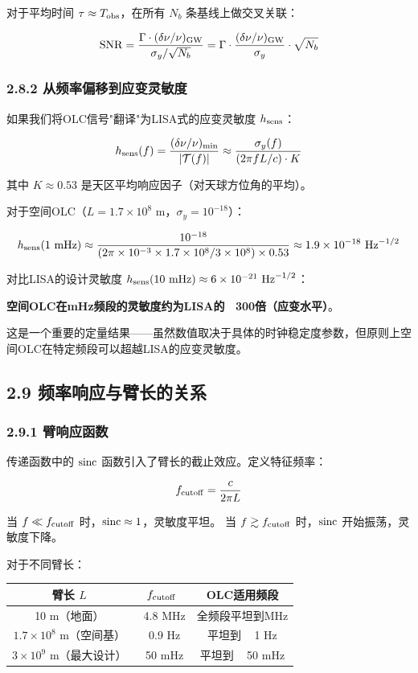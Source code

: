 \documentclass[12pt,a4paper]{article}
\begin{document}
对于平均时间 $\tau \approx T_{\rm obs}$，在所有 $N_b$ 条基线上做交叉关联：

$${\rm SNR} = \frac{\Gamma \cdot (\delta\nu/\nu)_{\rm GW}}{\sigma_y / \sqrt{N_b}} = \Gamma \cdot \frac{(\delta\nu/\nu)_{\rm GW}}{\sigma_y} \cdot \sqrt{N_b}$$

\subsubsection{2.8.2 从频率偏移到应变灵敏度}


如果我们将OLC信号"翻译"为LISA式的应变灵敏度 $h_{\rm sens}$：

$$h_{\rm sens}(f) = \frac{(\delta\nu/\nu)_{\rm min}}{|\mathcal{T}(f)|} \approx \frac{\sigma_y(f)}{(2\pi f L/c) \cdot K}$$

其中 $K \approx 0.53$ 是天区平均响应因子（对天球方位角的平均）。

对于空间OLC（$L = 1.7 \times 10^8$ m，$\sigma_y = 10^{-18}$）：

$$h_{\rm sens}(1\ {\rm mHz}) \approx \frac{10^{-18}}{(2\pi \times 10^{-3} \times 1.7\times 10^8 / 3\times 10^8) \times 0.53} \approx 1.9 \times 10^{-18}\ {\rm Hz}^{-1/2}$$

对比LISA的设计灵敏度 $h_{\rm sens}(10\ {\rm mHz}) \approx 6 \times 10^{-21}\ {\rm Hz}^{-1/2}$：

\textbf{空间OLC在mHz频段的灵敏度约为LISA的 ~300倍（应变水平）}。

这是一个重要的定量结果——虽然数值取决于具体的时钟稳定度参数，但原则上空间OLC在特定频段可以超越LISA的应变灵敏度。

\subsection{2.9 频率响应与臂长的关系}


\subsubsection{2.9.1 臂响应函数}


传递函数中的 ${\rm sinc}$ 函数引入了臂长的截止效应。定义特征频率：

$$f_{\rm cutoff} = \frac{c}{2\pi L}$$

当 $f \ll f_{\rm cutoff}$ 时，${\rm sinc} \approx 1$，灵敏度平坦。
当 $f \gtrsim f_{\rm cutoff}$ 时，${\rm sinc}$ 开始振荡，灵敏度下降。

对于不同臂长：

\begin{tabular}{|c|c|c|}
\hline
臂长 $L$ & $f_{\rm cutoff}$ & OLC适用频段 \\
\hline
10 m（地面） & ~4.8 MHz & 全频段平坦到MHz \\
$1.7 \times 10^{8}$ m（空间基） & ~0.9 Hz & 平坦到 ~ 1 Hz \\
$3 \times 10^{9}$ m（最大设计） & ~50 mHz & 平坦到 ~ 50 mHz \\
\hline
\end{tabular}
\end{document}

